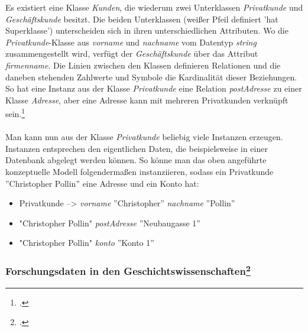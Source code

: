 \documentclass[12pt,a4paper]{article}
\begin{document}
Es existiert eine Klasse \textit{Kunden}, die wiederum zwei Unterklassen \textit{Privatkunde} und \textit{Geschäftskunde} besitzt. Die beiden Unterklassen (weißer Pfeil definiert 'hat Superklasse') unterscheiden sich in ihren unterschiedlichen Attributen. Wo die \textit{Privatkunde}-Klasse aus \textit{vorname} und \textit{nachname} vom Datentyp \textit{string} zusammengestellt wird, verfügt der \textit{Geschäftskunde} über das Attribut \textit{firmenname}. Die Linien zwischen den Klassen definieren Relationen und die daneben stehenden Zahlwerte und Symbole die Kardinalität dieser Beziehungen. So hat eine Instanz aus der Klasse \textit{Privatkunde} eine Relation \textit{postAdresse} zu einer Klasse \textit{Adresse}, aber eine Adresse kann mit mehreren Privatkunden verknüpft sein.\footcite[Vgl][S.99-108]{jannidis2017digital} 
\\
\\
Man kann nun aus der Klasse \textit{Privatkunde} beliebig viele Instanzen erzeugen. Instanzen entsprechen den eigentlichen Daten, die beispielsweise in einer Datenbank abgelegt werden können. So könne man das oben angeführte konzeptuelle Modell folgendermaßen instanziieren, sodass ein Privatkunde ''Christopher Pollin'' eine Adresse und ein Konto hat: 
\begin{itemize}
    \item[] Privatkunde --> \textit{vorname} ''Christopher'' \textit{nachname} ''Pollin''
    \item[] "Christopher Pollin" \textit{postAdresse} ''Neubaugasse 1''
    \item[] "Christopher Pollin" \textit{konto} ''Konto 1''
\end{itemize}{}

\subsubsection{Forschungsdaten in den Geschichtswissenschaften\footcite[Ausführlich habe ich mich mit den theoretischen Grundlagen der Informationswissenschaft, Daten - Information - Wissen, in folgender Arbeit auseinander gesetzt:][]{pollin2017suchen}}
\end{document}
